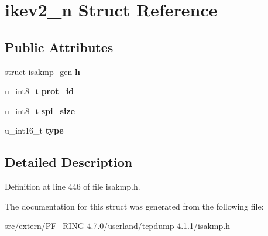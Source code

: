 \hypertarget{structikev2__n}{
\section{ikev2\_\-n Struct Reference}
\label{structikev2__n}
}
\subsection*{Public Attributes}
\begin{DoxyCompactItemize}
\item 
\hypertarget{structikev2__n_a6e37cc9eb2d6642d471c9807094e3bae}{
struct \hyperlink{structisakmp__gen}{isakmp\_\-gen} {\bfseries h}}
\label{structikev2__n_a6e37cc9eb2d6642d471c9807094e3bae}

\item 
\hypertarget{structikev2__n_a938cbb2bbf225e78c1ceb65cfc54616e}{
u\_\-int8\_\-t {\bfseries prot\_\-id}}
\label{structikev2__n_a938cbb2bbf225e78c1ceb65cfc54616e}

\item 
\hypertarget{structikev2__n_afc721243e866128014626b31b23602da}{
u\_\-int8\_\-t {\bfseries spi\_\-size}}
\label{structikev2__n_afc721243e866128014626b31b23602da}

\item 
\hypertarget{structikev2__n_a260c5911dc6824778d4383f7cab77319}{
u\_\-int16\_\-t {\bfseries type}}
\label{structikev2__n_a260c5911dc6824778d4383f7cab77319}

\end{DoxyCompactItemize}


\subsection{Detailed Description}


Definition at line 446 of file isakmp.h.



The documentation for this struct was generated from the following file:\begin{DoxyCompactItemize}
\item 
src/extern/PF\_\-RING-\/4.7.0/userland/tcpdump-\/4.1.1/isakmp.h\end{DoxyCompactItemize}
